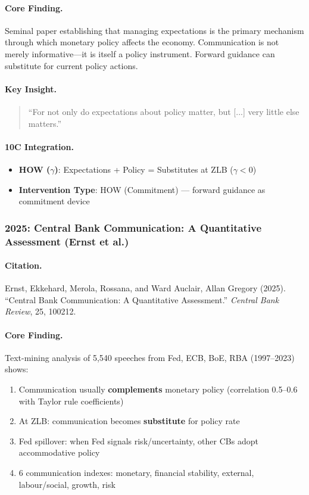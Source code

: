\paragraph{Core Finding.}
Seminal paper establishing that managing expectations is the primary mechanism through which
monetary policy affects the economy. Communication is not merely informative---it is itself
a policy instrument. Forward guidance can substitute for current policy actions.

\paragraph{Key Insight.}
\begin{quote}
``For not only do expectations about policy matter, but [...] very little else matters.''
\end{quote}

\paragraph{10C Integration.}
\begin{itemize}[nosep]
  \item \textbf{HOW ($\gamma$)}: Expectations + Policy = Substitutes at ZLB ($\gamma < 0$)
  \item \textbf{Intervention Type}: HOW (Commitment) --- forward guidance as commitment device
\end{itemize}

\subsubsection{2025: Central Bank Communication: A Quantitative Assessment (Ernst et al.)}

\paragraph{Citation.}
Ernst, Ekkehard, Merola, Rossana, and Ward Auclair, Allan Gregory (2025).
``Central Bank Communication: A Quantitative Assessment.''
\textit{Central Bank Review}, 25, 100212.

\paragraph{Core Finding.}
Text-mining analysis of 5,540 speeches from Fed, ECB, BoE, RBA (1997--2023) shows:
\begin{enumerate}[nosep]
  \item Communication usually \textbf{complements} monetary policy (correlation 0.5--0.6 with Taylor rule coefficients)
  \item At ZLB: communication becomes \textbf{substitute} for policy rate
  \item Fed spillover: when Fed signals risk/uncertainty, other CBs adopt accommodative policy
  \item 6 communication indexes: monetary, financial stability, external, labour/social, growth, risk
\end{enumerate}

